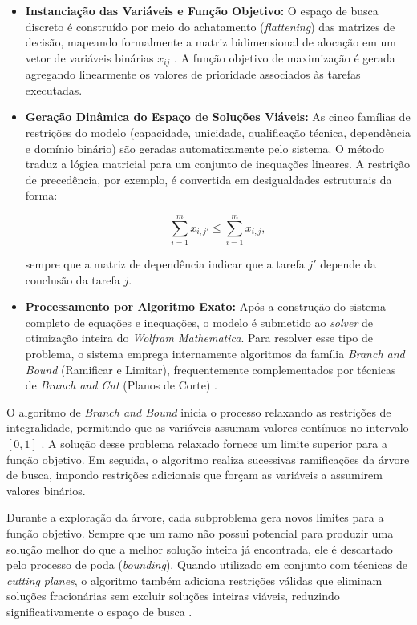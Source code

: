 \documentclass[12pt]{article}
\begin{document}
\begin{itemize}
    \item \textbf{Instanciação das Variáveis e Função Objetivo:} O espaço de busca discreto é construído por meio do achatamento (\textit{flattening}) das matrizes de decisão, mapeando formalmente a matriz bidimensional de alocação em um vetor de variáveis binárias $x_{ij}$ \cite{10.1007/978-3-540-45099-3_19}. A função objetivo de maximização é gerada agregando linearmente os valores de prioridade associados às tarefas executadas.

    \item \textbf{Geração Dinâmica do Espaço de Soluções Viáveis:} As cinco famílias de restrições do modelo (capacidade, unicidade, qualificação técnica, dependência e domínio binário) são geradas automaticamente pelo sistema. O método traduz a lógica matricial para um conjunto de inequações lineares. A restrição de precedência, por exemplo, é convertida em desigualdades estruturais da forma:
    
    \[
    \sum_{i=1}^{m} x_{i,j'} \leq \sum_{i=1}^{m} x_{i,j},
    \]
    
    sempre que a matriz de dependência indicar que a tarefa $j'$ depende da conclusão da tarefa $j$.

    \item \textbf{Processamento por Algoritmo Exato:} Após a construção do sistema completo de equações e inequações, o modelo é submetido ao \textit{solver} de otimização inteira do \textit{Wolfram Mathematica}. Para resolver esse tipo de problema, o sistema emprega internamente algoritmos da família \textit{Branch and Bound} (Ramificar e Limitar), frequentemente complementados por técnicas de \textit{Branch and Cut} (Planos de Corte) \cite{bellenguez2007,wolsey1998}.
\end{itemize}

O algoritmo de \textit{Branch and Bound} inicia o processo relaxando as restrições de integralidade, permitindo que as variáveis assumam valores contínuos no intervalo $[0,1]$ \cite{arenales2015pesquisa}. A solução desse problema relaxado fornece um limite superior para a função objetivo. Em seguida, o algoritmo realiza sucessivas ramificações da árvore de busca, impondo restrições adicionais que forçam as variáveis a assumirem valores binários.

Durante a exploração da árvore, cada subproblema gera novos limites para a função objetivo. Sempre que um ramo não possui potencial para produzir uma solução melhor do que a melhor solução inteira já encontrada, ele é descartado pelo processo de poda (\textit{bounding}). Quando utilizado em conjunto com técnicas de \textit{cutting planes}, o algoritmo também adiciona restrições válidas que eliminam soluções fracionárias sem excluir soluções inteiras viáveis, reduzindo significativamente o espaço de busca \cite{wolsey1998}.
\end{document}
